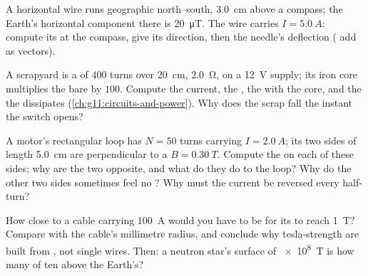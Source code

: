 \begin{exercise}[$\star\star\star$]\label{exo:g11:magnetic-fields:12}
A horizontal wire runs geographic north--south, \qty{3.0}{cm} above a
compass; the Earth's horizontal component there is \qty{20}{\micro T}.
The wire carries $I = \qty{5.0}{A}$: compute its  at the compass,
give its direction, then the needle's deflection ( add as vectors).
\end{exercise}

\begin{exercise}[$\star\star\star$]\label{exo:g11:magnetic-fields:13}
A scrapyard  is a  of $400$ turns over \qty{20}{cm},
 \qty{2.0}{\ohm}, on a \qty{12}{V} supply; its iron core
multiplies the bare  by $100$. Compute the current, the 
, the  with the core, and the  the  dissipates
(\cref{ch:g11:circuits-and-power}). Why does the scrap fall the
instant the switch opens?
\end{exercise}

\begin{exercise}[$\star\star\star$]\label{exo:g11:magnetic-fields:14}
A motor's rectangular loop has $N = 50$ turns carrying
$I = \qty{2.0}{A}$; its two sides of length \qty{5.0}{cm} are
perpendicular to a  $B = \qty{0.30}{T}$. Compute the  on each
of these sides; why are the two  opposite, and what do they do to
the loop? Why do the other two sides sometimes feel no ? Why must
the current be reversed every half-turn?
\end{exercise}

\begin{exercise}[$\star\star\star$]\label{exo:g11:magnetic-fields:15}
How close to a cable carrying \qty{100}{A} would you have to be for
its  to reach \qty{1}{T}? Compare with the cable's millimetre
radius, and conclude why tesla-strength  are built from
, not single wires. Then: a neutron star's surface  of
\qty{e8}{T} is how many  of ten above the Earth's?
\end{exercise}


